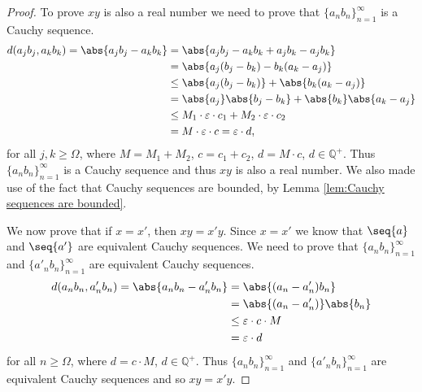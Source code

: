 {

\begin{proof}
    To prove $xy$ is also a real number we need to prove that $\{a_nb_n\}_{n=1}^{\infty}$ is a Cauchy sequence. 
    \begin{align*}
        d(a_jb_j, a_kb_k)= \abs{a_jb_j-a_kb_k}& = \abs{a_jb_j-a_kb_k+a_jb_k-a_jb_k} \\
        & =\abs{a_j(b_j-b_k)-b_k(a_k-a_j)} \\
        & \leq \abs{a_j(b_j-b_k)}+\abs{b_k(a_k-a_j)} \\
        & = \abs{a_j}\abs{b_j-b_k} + \abs{b_k}\abs{a_k-a_j} \\
        & \leq M_1 \cdot \varepsilon \cdot c_1 + M_2 \cdot \varepsilon \cdot c_2 \\
        & = M \cdot \varepsilon \cdot c = \varepsilon \cdot d,
    \end{align*}
    for all $j,k \geq \Omega$, where $M=M_1+M_2$, $c=c_1+c_2$, $d=M \cdot c$, $d \in \mathbb{Q}^+$. Thus $\{a_nb_n\}_{n=1}^{\infty}$ is a Cauchy sequence and thus $xy$ is also a real number. We also made use of the fact that Cauchy sequences are bounded, by Lemma \ref{lem:Cauchy sequences are bounded}.

    We now prove that if $x=x'$, then $xy=x'y$. Since $x=x'$ we know that $\seq{a}$ and $\seq{a'}$ are equivalent Cauchy sequences. We need to prove that $\{a_nb_n\}_{n=1}^{\infty}$ and $\{a'_nb_n\}_{n=1}^{\infty}$ are equivalent Cauchy sequences. 
    \begin{align*}
        d(a_nb_n, a'_nb_n)=\abs{a_nb_n - a'_nb_n} & = \abs{(a_n-a'_n)b_n} \\
        & = \abs{(a_n-a'_n)} \abs{b_n} \\
        & \leq  \varepsilon \cdot c \cdot M \\
        & = \varepsilon \cdot d
    \end{align*}
    for all $n \geq \Omega$, where $d=c \cdot M$, $d \in \mathbb{Q}^+$. Thus $\{a_nb_n\}_{n=1}^{\infty}$ and $\{a'_nb_n\}_{n=1}^{\infty}$ are equivalent Cauchy sequences and so $xy=x'y$.
\end{proof}

}
